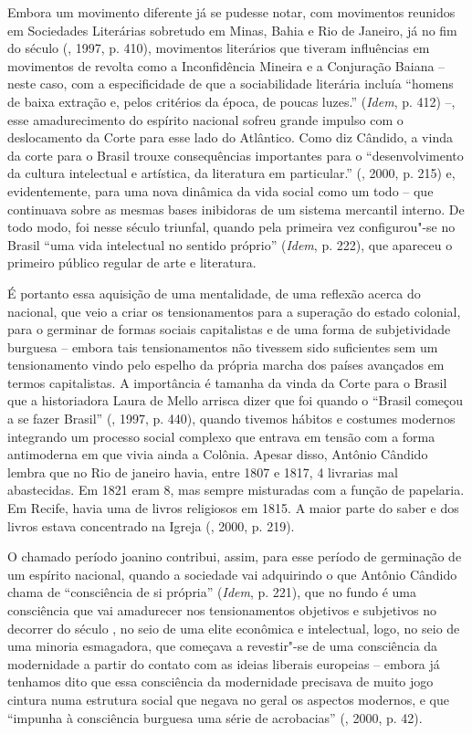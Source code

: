 {Embora um movimento diferente já se pudesse notar, com movimentos
reunidos em Sociedades Literárias sobretudo em Minas, Bahia e Rio de
Janeiro, já no fim do século  (, 1997, p. 410), movimentos
literários que tiveram influências em movimentos de revolta como a
Inconfidência Mineira e a Conjuração Baiana -- neste caso, com a
especificidade de que a sociabilidade literária incluía ``homens de
baixa extração e, pelos critérios da época, de poucas luzes.''
(\emph{Idem}, p. 412) --, esse amadurecimento do espírito nacional
sofreu grande impulso com o deslocamento da Corte para esse lado do
Atlântico. Como diz Cândido, a vinda da corte para o Brasil trouxe
consequências importantes para o ``desenvolvimento da cultura
intelectual e artística, da literatura em particular.'' (, 2000,
p. 215) e, evidentemente, para uma nova dinâmica da vida social como um
todo -- que continuava sobre as mesmas bases inibidoras de um sistema
mercantil interno. De todo modo, foi nesse século triunfal, quando pela
primeira vez configurou"-se no Brasil ``uma vida intelectual no sentido
próprio'' (\emph{Idem}, p. 222), que apareceu o primeiro público regular
de arte e literatura.

É portanto essa aquisição de uma mentalidade, de uma reflexão acerca do
nacional, que veio a criar os tensionamentos para a superação do estado
colonial, para o germinar de formas sociais capitalistas e de uma forma
de subjetividade burguesa -- embora tais tensionamentos não tivessem
sido suficientes sem um tensionamento vindo pelo espelho da própria
marcha dos países avançados em termos capitalistas. A importância é
tamanha da vinda da Corte para o Brasil que a historiadora Laura de
Mello arrisca dizer que foi quando o ``Brasil começou a se fazer
Brasil'' (, 1997, p. 440), quando tivemos hábitos e costumes
modernos integrando um processo social complexo que entrava em tensão
com a forma antimoderna em que vivia ainda a Colônia. Apesar disso, Antônio Cândido
lembra que no Rio de janeiro havia, entre 1807 e 1817, 4 livrarias mal
abastecidas. Em 1821 eram 8, mas sempre misturadas com a função de
papelaria. Em Recife, havia uma de livros religiosos em 1815. A maior
parte do saber e dos livros estava concentrado na Igreja (, 2000,
p. 219).

O chamado período joanino contribui, assim, para esse período de
germinação de um espírito nacional, quando a sociedade vai adquirindo o
que Antônio Cândido chama de ``consciência de si própria'' (\emph{Idem},
p. 221), que no fundo é uma consciência que vai amadurecer nos
tensionamentos objetivos e subjetivos no decorrer do século , no seio
de uma elite econômica e intelectual, logo, no seio de uma minoria
esmagadora, que começava a revestir"-se de uma consciência da modernidade
a partir do contato com as ideias liberais europeias -- embora já
tenhamos dito que essa consciência da modernidade precisava de muito
jogo cintura numa estrutura social que negava no geral os aspectos
modernos, e que ``impunha à consciência burguesa uma série de
acrobacias'' (, 2000, p. 42).

}

